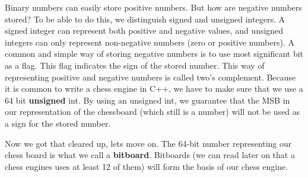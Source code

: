 Binary numbers can easily store positive numbers.
But how are negative numbers stored?
To be able to do this, we distinguish signed and unsigned integers. 
A signed integer can represent both positive and negative values, and unsigned integers can only represent non-negative numbers (zero or positive numbers).
A common and simple way of storing negative numbers is to use most significant bit as a flag. 
This flag indicates the sign of the stored number.
This way of representing positive and negative numbers is called two's complement.
Because it is common to write a chess engine in C++, we have to make sure that we use a 64 bit \textbf{unsigned} int.
By using an unsigned int, we guarantee that the MSB in our representation of the chessboard (which still is a number) will not be used as a sign for the stored number.

Now we got that cleared up, lets move on.
The 64-bit number representing our chess board is what we call a \textbf{bitboard}.
Bitboards (we can read later on that a chess engines uses at least 12 of them) will form the basis of our chess engine.

